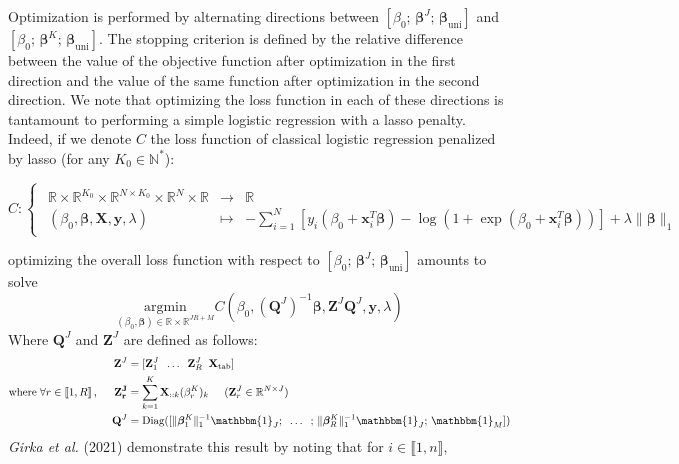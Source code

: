 \documentclass[10pt]{article}
\begin{document}
\noindent Optimization is performed by alternating directions between $\left[ \beta_0 ;\, \bm{\beta}^J  ; \,  \bm{\beta}_{\text{uni}}   \right]$ and  $\left[ \beta_0; \, \bm{\beta}^K  ;\, \bm{\beta}_{\text{uni}}  \right]$. The stopping criterion is defined by the relative difference between the value of the objective function after optimization in the first direction and the value of the same function after optimization in the second direction.  We note that optimizing the loss function in each of these directions is tantamount to performing a simple logistic regression with a lasso penalty. Indeed, if we denote $C$ the loss function of classical logistic regression penalized by lasso (for any $K_0 \in \mathbb{N}^{*}$): 

\begin{equation}
C: \begin{cases} 
    \begin{array}{ccl}
    \mathbb{R} \times \mathbb{R}^{K_0} \times \mathbb{R}^{N \times K_0} \times \mathbb{R}^{N} \times \mathbb{R} & \longrightarrow & \mathbb{R} \\
    (\beta_0, \bm{\beta}, \mathbf{X}, \mathbf{y}, \lambda ) & \longmapsto & -\displaystyle{\sum\limits_{i = 1}^N} [ y_i(\beta_0 + \mathbf{x}_i^T \bm{\beta}) - \log(1 + \exp(\beta_0 + \mathbf{x}_i^T \bm{\beta})) ] + \lambda \lVert \bm{\beta} \rVert_1
     \end{array}
\end{cases}
\end{equation}

\noindent optimizing the overall loss function with respect to $\left[ \beta_0;\, \bm{\beta}^J ;\, \bm{\beta}_{\text{uni}}  \right]$ amounts to solve
\begin{equation}
\underset{(\beta_0, \bm{\beta}) \in \mathbb{R} \times \mathbb{R}^{JR + M}}{\text{argmin}}  C(\beta_0, (\mathbf{Q}^J)^{-1}\bm{\beta},\mathbf{Z}^J \mathbf{Q}^J, \mathbf{y}, \lambda) 
\end{equation}
\noindent Where $\mathbf{Q}^J$ and $\mathbf{Z}^J$ are defined as follows: 
\begin{align}
    \mathbf{Z}^J &= [\mathbf{Z}_1^J \; \; \hdots \; \; \mathbf{Z}_R^J \; \;  \mathbf{X}_{\text{tab}}]\\
    \text{where} \; \forall r \in \llbracket 1, R\rrbracket\, , \hspace{0.5 cm} \mathbf{Z_r^J} &= \sum\limits_{k = 1}^K \mathbf{X}_{::k} (\beta_r^K)_k \hspace{0.5 cm} (\mathbf{Z}_r^J \in \mathbb{R}^{N \times J})\\
    \hspace{7 pt}
    \mathbf{Q}^J &= \text{Diag}([\lVert \bm{\beta}_1^K \rVert_1^{-1} \mathbbm{1}_J; \; \; \hdots \; \; ;\, \lVert \bm{\beta}_R^K \rVert_1^{-1} \mathbbm{1}_J ;\,  \mathbbm{1}_M])
\end{align}
\hspace{10 pt}
 \noindent \textit{Girka et al.} (2021) \cite{multi_rank_r} demonstrate this result by noting that for $i \in \llbracket 1, n\rrbracket$,
\end{document}
